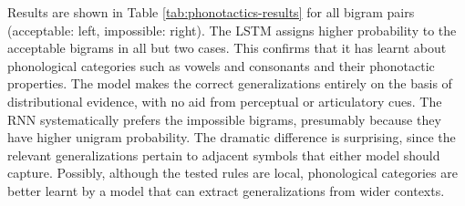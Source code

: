 Results are shown in Table \ref{tab:phonotactics-results} for all
bigram pairs (acceptable: left, impossible: right).  The LSTM assigns
higher probability to the acceptable bigrams in all but two cases.
This confirms that it has learnt about phonological categories such as
vowels and consonants and their phonotactic properties.  The
model makes the correct generalizations entirely on the basis of
distributional evidence, with no aid from perceptual or articulatory
cues. The RNN systematically prefers the impossible
bigrams, presumably because they have higher unigram probability. The
dramatic difference is surprising, since the relevant generalizations
pertain to adjacent symbols that either model should
capture. Possibly, although the tested rules are local, phonological
categories are better learnt by a model that can extract
generalizations from wider contexts.

